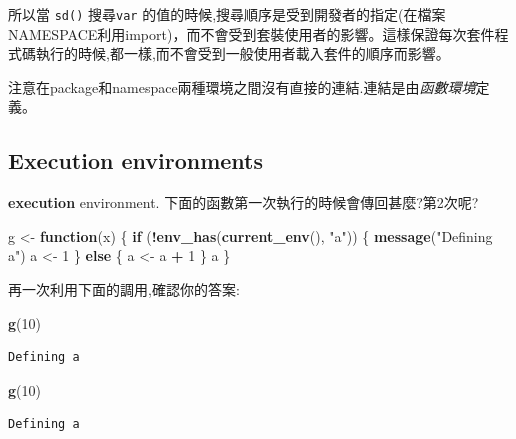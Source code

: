 \documentclass[]{book}
\newenvironment{Shaded}{\begin{snugshade}}{\end{snugshade}}
\newcommand{\ControlFlowTok}[1]{\textcolor[rgb]{0.13,0.29,0.53}{\textbf{#1}}}
\newcommand{\DecValTok}[1]{\textcolor[rgb]{0.00,0.00,0.81}{#1}}
\newcommand{\KeywordTok}[1]{\textcolor[rgb]{0.13,0.29,0.53}{\textbf{#1}}}
\newcommand{\NormalTok}[1]{#1}
\newcommand{\OperatorTok}[1]{\textcolor[rgb]{0.81,0.36,0.00}{\textbf{#1}}}
\newcommand{\StringTok}[1]{\textcolor[rgb]{0.31,0.60,0.02}{#1}}
\theoremstyle{definition}
\theoremstyle{definition}
\theoremstyle{definition}
\theoremstyle{remark}
\begin{document}
所以當 \texttt{sd()} 搜尋\texttt{var}
的值的時候,搜尋順序是受到開發者的指定(在檔案NAMESPACE利用import)，而不會受到套裝使用者的影響。這樣保證每次套件程式碼執行的時候,都一樣,而不會受到一般使用者載入套件的順序而影響。

注意在package和namespace兩種環境之間沒有直接的連結.連結是由\emph{函數環境}定義。

\hypertarget{execution-environments}{%
\subsection{Execution environments}\label{execution-environments}}

\textbf{execution} environment.
下面的函數第一次執行的時候會傳回甚麼?第2次呢?

\begin{Shaded}
\begin{Highlighting}[]
\NormalTok{g <-}\StringTok{ }\ControlFlowTok{function}\NormalTok{(x) \{}
  \ControlFlowTok{if}\NormalTok{ (}\OperatorTok{!}\KeywordTok{env_has}\NormalTok{(}\KeywordTok{current_env}\NormalTok{(), }\StringTok{"a"}\NormalTok{)) \{}
    \KeywordTok{message}\NormalTok{(}\StringTok{"Defining a"}\NormalTok{)}
\NormalTok{    a <-}\StringTok{ }\DecValTok{1}
\NormalTok{  \} }\ControlFlowTok{else}\NormalTok{ \{}
\NormalTok{    a <-}\StringTok{ }\NormalTok{a }\OperatorTok{+}\StringTok{ }\DecValTok{1}
\NormalTok{  \}}
\NormalTok{  a}
\NormalTok{\}}
\end{Highlighting}
\end{Shaded}

再一次利用下面的調用,確認你的答案:

\begin{Shaded}
\begin{Highlighting}[]
\KeywordTok{g}\NormalTok{(}\DecValTok{10}\NormalTok{)}
\end{Highlighting}
\end{Shaded}

\begin{verbatim}
Defining a
\end{verbatim}

\begin{Shaded}
\begin{Highlighting}[]
\KeywordTok{g}\NormalTok{(}\DecValTok{10}\NormalTok{)}
\end{Highlighting}
\end{Shaded}

\begin{verbatim}
Defining a
\end{verbatim}
\end{document}
